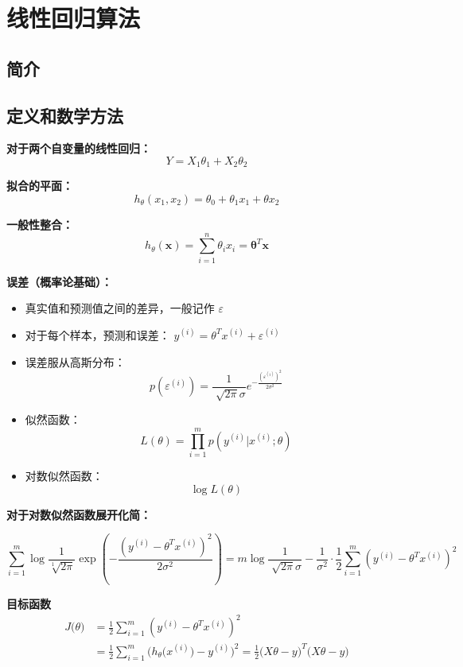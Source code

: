 
\section{线性回归算法}


\subsection{简介}


\subsection{定义和数学方法}

\textbf{对于两个自变量的线性回归：}
\[Y = X_1 \theta_1 + X_2 \theta_2\]

\textbf{拟合的平面：}
\[h_\theta (x_1, x_2) = \theta_0 + \theta_1 x_1 + \theta x_2 \]

\textbf{一般性整合：}
\[h_\theta (\mathbf{x}) = \sum_{i = 1}^{n} \theta_i x_i =  \mathbf{\theta}^T \mathbf{x}\]

\textbf{误差（概率论基础）：} 
\begin{itemize}
    \item 真实值和预测值之间的差异，一般记作 \(\varepsilon \)
    \item 对于每个样本，预测和误差： \(y^{(i)} = \theta^T x^{(i)} + \varepsilon^{(i)}\)
    \item 误差服从高斯分布：
    \[p(\varepsilon^{(i)}) = \frac{1}{\sqrt[]{2 \pi}\sigma} e^{-\frac{(\varepsilon^{(i)})^2}{2 \sigma^2}} \]
    \item 似然函数：
    \[ L(\theta) =  \prod_{i=1}^{m} p(y^{(i)}| x^{(i)};\theta)  \]
    \item 对数似然函数：
    \[ \log L(\theta)\]   
\end{itemize}

\textbf{对于对数似然函数展开化简：}

$$\sum_{i=1}^{m}\log\frac{1}{\sqrt[1]{2\pi}}\exp(-\frac{(y^{(i)}-\theta^Tx^{(i)})^2}{2\sigma^2})= m \log\frac{1}{\sqrt[]{2\pi}\sigma } - \frac{1}{\sigma^2}\cdot \frac{1}{2}\sum_{i=1}^{m}(y^{(i)}-\theta^T x^{(i)})^2 $$

\textbf{目标函数}
\begin{align*}
    J\big(\theta\big) & ={\frac{1}{2}}\sum_{i=1}^{m}(y^{(i)}-\theta^{T}x^{(i)})^{2}\\
    & ={\frac{1}{2}}\sum_{i=1}^{m}{\Big(}h_{\theta}{\big(}x^{(i)}{\big)}-y^{(i)}{\Big)}^{2}={\frac{1}{2}}{\big(}X\theta-y{\big)}^{T}{\big(}X\theta-y{\big)}\\
\end{align*} 

